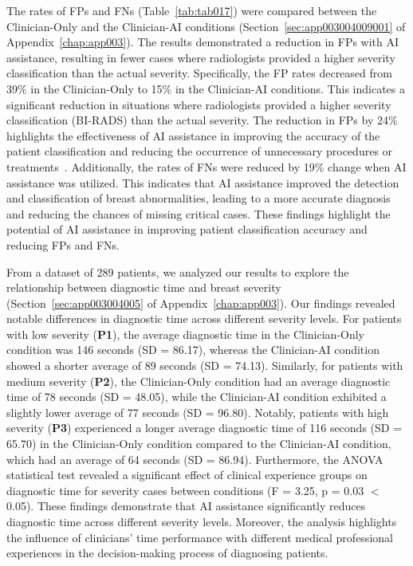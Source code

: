 The rates of \acp{FP} and \acp{FN} (Table~\ref{tab:tab017}) were compared between the Clinician-Only and the Clinician-AI conditions (Section~\ref{sec:app003004009001} of Appendix~\ref{chap:app003}).
The results demonstrated a reduction in \acp{FP} with \ac{AI} assistance, resulting in fewer cases where radiologists provided a higher severity classification than the actual severity.
Specifically, the \ac{FP} rates decreased from 39\% in the Clinician-Only to 15\% in the Clinician-AI conditions.
This indicates a significant reduction in situations where radiologists provided a higher severity classification (\ac{BI-RADS}) than the actual severity.
The reduction in \acp{FP} by 24\% highlights the effectiveness of \ac{AI} assistance in improving the accuracy of the patient classification and reducing the occurrence of unnecessary procedures or treatments~\cite{10.1001/jamainternmed.2014.981}.
Additionally, the rates of \acp{FN} were reduced by 19\% change when \ac{AI} assistance was utilized.
This indicates that \ac{AI} assistance improved the detection and classification of breast abnormalities, leading to a more accurate diagnosis and reducing the chances of missing critical cases.
These findings highlight the potential of AI assistance in improving patient classification accuracy and reducing \acp{FP} and \acp{FN}.



From a dataset of 289 patients, we analyzed our results to explore the relationship between diagnostic time and breast severity (Section~\ref{sec:app003004005} of Appendix~\ref{chap:app003}).
Our findings revealed notable differences in diagnostic time across different severity levels.
For patients with low severity ({\bf P1}), the average diagnostic time in the Clinician-Only condition was 146 seconds (SD = 86.17), whereas the Clinician-AI condition showed a shorter average of 89 seconds (SD = 74.13).
Similarly, for patients with medium severity ({\bf P2}), the Clinician-Only condition had an average diagnostic time of 78 seconds (SD = 48.05), while the Clinician-AI condition exhibited a slightly lower average of 77 seconds (SD = 96.80).
Notably, patients with high severity ({\bf P3}) experienced a longer average diagnostic time of 116 seconds (SD = 65.70) in the Clinician-Only condition compared to the Clinician-AI condition, which had an average of 64 seconds (SD = 86.94).
Furthermore, the \ac{ANOVA} statistical test revealed a significant effect of clinical experience groups on diagnostic time for severity cases between conditions (F = 3.25, p = 0.03 $<$ 0.05).
These findings demonstrate that \ac{AI} assistance significantly reduces diagnostic time across different severity levels.
Moreover, the analysis highlights the influence of clinicians' time performance with different medical professional experiences in the decision-making process of diagnosing patients.

